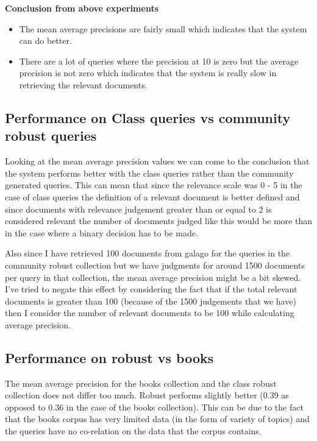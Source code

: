 \documentclass[12pt,letterpaper]{article}
\begin{document}
\textbf{Conclusion from above experiments}
\begin{itemize}
\item The mean average precisions are fairly small which indicates that the system can do better.
\item There are a lot of queries where the precision at 10 is zero but the average precision is not zero which indicates that the system is really slow in retrieving the relevant documents.
\end{itemize}

\subsection*{Performance on Class queries vs community robust queries}
Looking at the mean average precision values we can come to the conclusion that the system performs better with the class queries rather than the community generated queries. This can mean that since the relevance scale was 0 - 5 in the case of class queries the definition of a relevant document is better defined and since documents with relevance judgement greater than or equal to 2 is considered relevant the number of documents judged like this would be more than in the case where a binary decision has to be made.

Also since I have retrieved 100 documents from galago for the queries in the community robust collection but we have judgments for around 1500 documents per query in that collection, the mean average precision might be a bit skewed.  I've tried to negate this effect by considering the fact that if the total relevant documents is greater than 100 (because of the 1500 judgements that we have) then I consider the number of relevant documents to be 100 while calculating average precision.

\subsection*{Performance on robust vs books }
The mean average precision for the books collection and the class robust collection does not differ too much. Robust performs slightly better (0.39 as opposed to 0.36 in the case of the books collection). This can be due to the fact that the books corpus has very limited data (in the form of variety of topics) and the queries have no co-relation on the data that the corpus contains.
\end{document}

